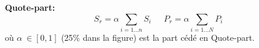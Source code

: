 \begin{f}
\textbf{Quote-part:}
$$
S_r=\alpha \sum_{i=1\ldots n}S_i\quad \ \ P_r=\alpha\sum_{i=1\ldots N}P_i 
$$
où $\alpha\ \in [0,1]$ (25\% dans la figure) est la part cédé en  Quote-part.
	

	

\end{f}
